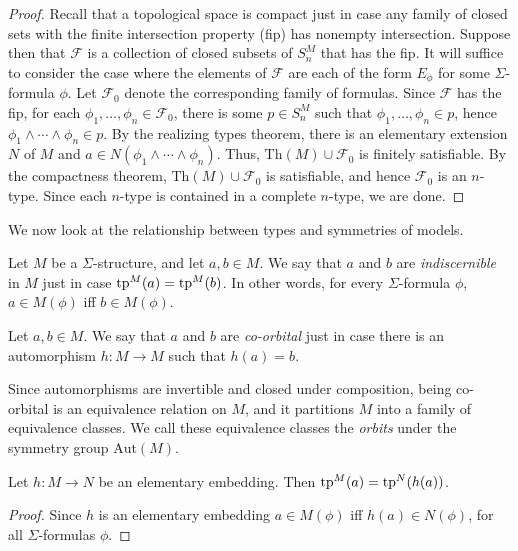\begin{proof} Recall that a topological space is compact just in case
  any family of closed sets with the finite intersection property
  (fip) has nonempty intersection.  Suppose then that $\mathcal{F}$ is
  a collection of closed subsets of $S_n^M$ that has the fip.  It will
  suffice to consider the case where the elements of $\mathcal{F}$ are
  each of the form $E_\phi$ for some $\Sigma$-formula $\phi$.  Let
  $\mathcal{F}_0$ denote the corresponding family of formulas.  Since
  $\mathcal{F}$ has the fip, for each
  $\phi _1,\dots ,\phi _n\in \mathcal{F} _0$, there is some
  $p\in S^M_n$ such that $\phi _1,\dots ,\phi _n\in p$, hence
  $\phi _1\wedge\cdots\wedge\phi _n\in p$.  By the realizing types
  theorem, there is an elementary extension $N$ of $M$ and
  $a\in N(\phi _1\wedge\cdots\wedge \phi _n)$.  Thus,
  $\mathrm{Th}(M)\cup \mathcal{F}_0$ is finitely satisfiable.  By the
  compactness theorem, $\mathrm{Th}(M)\cup \mathcal{F}_0$ is
  satisfiable, and hence $\mathcal{F}_0$ is an $n$-type.  Since each
  $n$-type is contained in a complete $n$-type, we are done.
\end{proof}

We now look at the relationship between types and symmetries of
models.

\begin{defn} Let $M$ be a $\Sigma$-structure, and let $a,b\in M$.  We
  say that $a$ and $b$ are \emph{indiscernible} in $M$ just in case
  $\mathrm{tp}^{M}(a)=\mathrm{tp}^{M}(b)$.  In other words, for every $\Sigma$-formula
  $\phi$, $a\in M(\phi )$ iff $b\in M(\phi )$.  \end{defn}

\begin{defn} Let $a,b\in M$.  We say that $a$ and $b$ are
  \emph{co-orbital} just in case there is an automorphism $h:M\to M$
  such that $h(a)=b$.  \end{defn}

Since automorphisms are invertible and closed under composition, being
co-orbital is an equivalence relation on $M$, and it partitions $M$
into a family of equivalence classes.  We call these equivalence
classes the \emph{orbits} under the symmetry group $\mathrm{Aut}(M)$.

\begin{prop} Let $h:M\to N$ be an elementary embedding.  Then
  $\mathrm{tp}^{M}(a)=\mathrm{tp}^{N}(h(a))$.  \end{prop}

\begin{proof} Since $h$ is an elementary embedding $a\in M(\phi )$ iff
  $h(a)\in N(\phi )$, for all $\Sigma$-formulas $\phi$. \end{proof}

